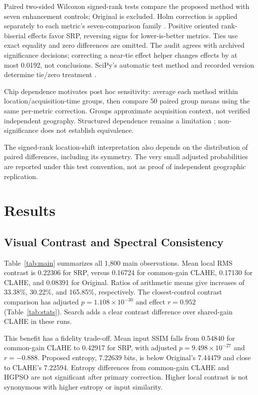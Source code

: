 \documentclass[conference]{IEEEtran}
\begin{document}
Paired two-sided Wilcoxon signed-rank tests compare the proposed method with seven enhancement controls; Original is excluded. Holm correction is applied separately to each metric's seven-comparison family \cite{holm1979}. Positive oriented rank-biserial effects favor SRP, reversing signs for lower-is-better metrics. Ties use exact equality and zero differences are omitted. The audit agrees with archived significance decisions; correcting a near-tie effect helper changes effects by at most 0.0192, not conclusions. SciPy's automatic test method and recorded version determine tie/zero treatment \cite{scipyDocs}.

Chip dependence motivates post hoc sensitivity: average each method within location/acquisition-time groups, then compare 50 paired group means using the same per-metric correction. Groups approximate acquisition context, not verified independent geography. Structured dependence remains a limitation \cite{roberts2017}; non-significance does not establish equivalence.

The signed-rank location-shift interpretation also depends on the distribution of paired differences, including its symmetry. The very small adjusted probabilities are reported under this test convention, not as proof of independent geographic replication.

\section{Results}
\label{sec:results}

\subsection{Visual Contrast and Spectral Consistency}
Table~\ref{tab:main} summarizes all 1,800 main observations. Mean local RMS contrast is 0.22306 for SRP, versus 0.16724 for common-gain CLAHE, 0.17130 for CLAHE, and 0.08391 for Original. Ratios of arithmetic means give increases of 33.38\%, 30.22\%, and 165.85\%, respectively. The closest-control contrast comparison has adjusted $p=1.108\times10^{-30}$ and effect $r=0.952$ (Table~\ref{tab:stats}). Search adds a clear contrast difference over shared-gain CLAHE in these runs.

This benefit has a fidelity trade-off. Mean input SSIM falls from 0.54840 for common-gain CLAHE to 0.42917 for SRP, with adjusted $p=9.498\times10^{-27}$ and $r=-0.888$. Proposed entropy, 7.22639 bits, is below Original's 7.44479 and close to CLAHE's 7.22594. Entropy differences from common-gain CLAHE and HGPSO are not significant after primary correction. Higher local contrast is not synonymous with higher entropy or input similarity.
\end{document}
